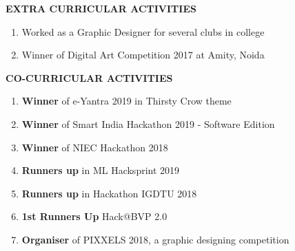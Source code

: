 \documentclass[10pt]{article}
\begin{document}
\begin{minipage}{0.95\textwidth}
\vspace{5mm}
\begin{huge}
\textbf{\color{theme}EXTRA CURRICULAR ACTIVITIES}
\end{huge}
\begin{mdframed}[backgroundcolor=theme]
\end{mdframed}

\vspace{1mm}

\color{black}\normalsize{{
\begin{enumerate}
\item Worked as a Graphic Designer for several clubs in college\\
\item Winner of Digital Art Competition 2017 at Amity, Noida\\


\end{enumerate}
}}
\vspace{2mm}
\end{minipage}

\vspace{5mm}
\begin{huge}
\textbf{\color{theme}CO-CURRICULAR ACTIVITIES}
\end{huge}
\begin{mdframed}[backgroundcolor=theme]
\end{mdframed}

\vspace{1mm}

\color{black}\normalsize{{
\begin{enumerate}
\item \textbf{Winner} of e-Yantra 2019 in Thirsty Crow theme\\
\item \textbf{Winner} of Smart India Hackathon 2019 - Software Edition\\
\item \textbf{Winner} of NIEC Hackathon 2018\\
\item \textbf{Runners up} in ML Hacksprint 2019\\
\item \textbf{Runners up} in Hackathon IGDTU 2018\\
\item \textbf{1st Runners Up} Hack@BVP 2.0\\
\item \textbf{Organiser} of PIXXELS 2018, a graphic designing competition\\


\end{enumerate}
}}
\end{document}
